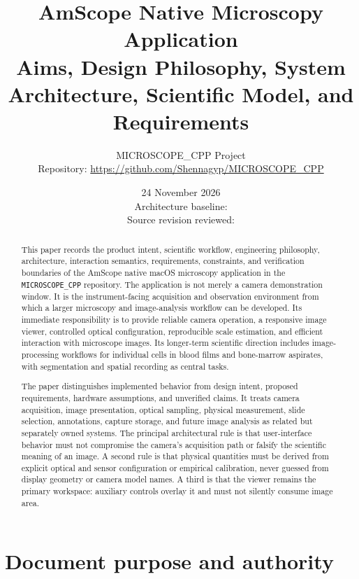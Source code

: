 \documentclass[11pt,a4paper,oneside]{article}
\title{\Huge AmScope Native Microscopy Application\\[0.5em]
\Large Aims, Design Philosophy, System Architecture, Scientific Model, and Requirements}
\author{MICROSCOPE\_CPP Project\\
\small Repository: \url{https://github.com/Shennagyp/MICROSCOPE_CPP}}
\date{24 November 2026\\[0.5em]
\small Architecture baseline: \code{amscope-native-app-mac.v.0.8-docksystem}\\
\small Source revision reviewed: \code{5c20a13017ab75a99a919154e0e85b789811bacf}}
\newcommand{\code}[1]{\texttt{\small #1}}
\begin{document}
\maketitle
\begin{abstract}
This paper records the product intent, scientific workflow, engineering philosophy, architecture, interaction semantics, requirements, constraints, and verification boundaries of the AmScope native macOS microscopy application in the \code{MICROSCOPE\_CPP} repository. The application is not merely a camera demonstration window. It is the instrument-facing acquisition and observation environment from which a larger microscopy and image-analysis workflow can be developed. Its immediate responsibility is to provide reliable camera operation, a responsive image viewer, controlled optical configuration, reproducible scale estimation, and efficient interaction with microscope images. Its longer-term scientific direction includes image-processing workflows for individual cells in blood films and bone-marrow aspirates, with segmentation and spatial recording as central tasks.

The paper distinguishes implemented behavior from design intent, proposed requirements, hardware assumptions, and unverified claims. It treats camera acquisition, image presentation, optical sampling, physical measurement, slide selection, annotations, capture storage, and future image analysis as related but separately owned systems. The principal architectural rule is that user-interface behavior must not compromise the camera's acquisition path or falsify the scientific meaning of an image. A second rule is that physical quantities must be derived from explicit optical and sensor configuration or empirical calibration, never guessed from display geometry or camera model names. A third is that the viewer remains the primary workspace: auxiliary controls overlay it and must not silently consume image area.
\end{abstract}

\tableofcontents
\newpage

\section{Document purpose and authority}
\end{document}
